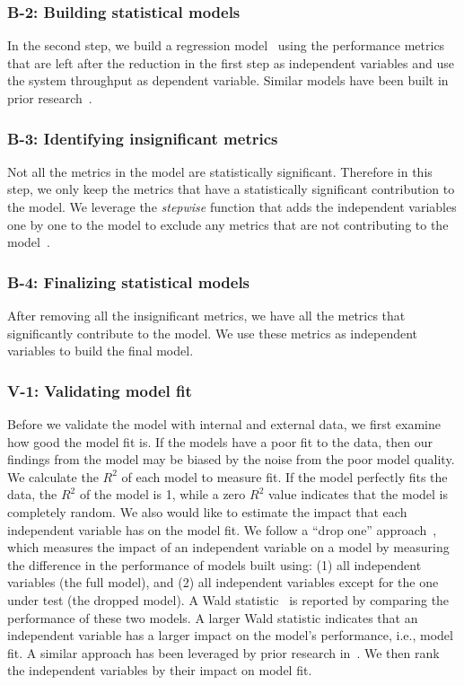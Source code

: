 \subsubsection{B-2: Building statistical models}

In the second step, we build a regression model~\cite{freedman2009statistical} using the performance metrics that are left after the reduction in the first step as independent variables and use the system throughput as dependent variable. Similar models have been built in prior research~\cite{Cohen:2005:CIC:1095810.1095821,xiong2013vperfguard}.

\subsubsection{B-3: Identifying insignificant metrics}
Not all the metrics in the model are statistically significant. Therefore in this step, we only keep the metrics that have a statistically significant contribution to the model. We leverage the \textit{stepwise} function that adds the independent variables one by one to the model to exclude any metrics that are not contributing to the model~\cite{RInAction}. 

\subsubsection{B-4: Finalizing statistical models}
After removing all the insignificant metrics, we have all the metrics that significantly contribute to the model. We use these metrics as independent variables to build the final model.

\subsubsection{V-1: Validating model fit}

Before we validate the model with internal and external data, we first examine how good the model fit is. If the models have a poor fit to the data, then our findings from the model may be biased by the noise from the poor model quality. We calculate the $R^2$ of each model to measure fit. If the model perfectly fits the data, the $R^2$ of the model is 1, while a zero $R^2$ value indicates that the model is completely random. We also would like to estimate the impact that each independent variable has on the model fit. We follow a ``drop one'' approach~\cite{Chambers1990}, which measures the impact of an independent variable on a model by measuring the difference in the performance of models built using: (1) all independent variables (the full model), and (2) all independent variables except for the one under test (the dropped model). A Wald statistic~\cite{harrell2015regression} is reported by comparing the performance of these two models. A larger Wald statistic indicates that an independent variable has a larger impact on the model's performance, i.e., model fit. A similar approach has been leveraged by prior research in~\cite{mcintosh2015emse}. We then rank the independent variables by their impact on model fit. 


